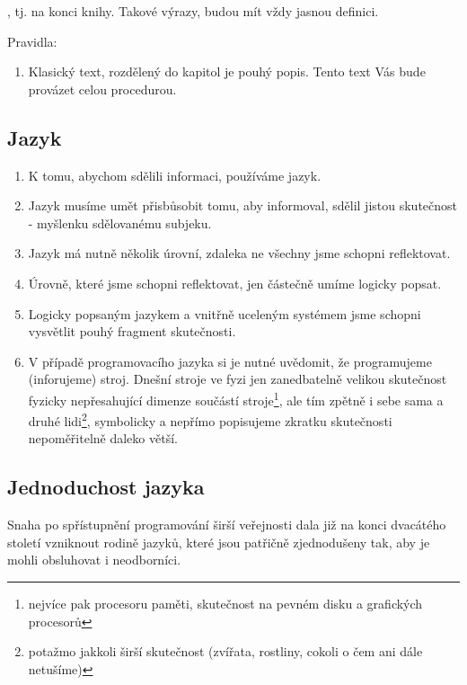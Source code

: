 \documentclass[11pt]{article}
\begin{document}
, tj. na konci knihy. Takové výrazy, budou mít vždy jasnou definici.



Pravidla:

\begin{enumerate}
\item
Klasický text, rozdělený do kapitol je pouhý popis. Tento text Vás bude provázet celou procedurou.


\end{enumerate}


\subsection{Jazyk}


\begin{enumerate}
\item
K tomu, abychom sdělili informaci, používáme jazyk.


\item
Jazyk musíme umět přisbůsobit tomu, aby informoval, sdělil jistou skutečnost - myšlenku sdělovanému subjeku.

\item
Jazyk má nutně několik úrovní, zdaleka ne všechny jsme schopni reflektovat.

\item
Úrovně, které jsme schopni reflektovat, jen částečně umíme logicky popsat.

\item
Logicky popsaným jazykem a vnitřně uceleným systémem jsme schopni vysvětlit pouhý fragment skutečnosti.

\item
V případě programovacího jazyka si je nutné uvědomit, že programujeme (inforujeme) stroj. Dnešní stroje ve fyzi jen zanedbatelně velikou skutečnost fyzicky nepřesahující dimenze součástí stroje\footnote{nejvíce pak procesoru paměti, skutečnost na pevném disku a grafických procesorů}, ale tím zpětně i sebe sama a druhé lidi\footnote{potažmo jakkoli širší skutečnost (zvířata, rostliny, cokoli o čem ani dále netušíme)}, symbolicky a nepřímo popisujeme zkratku skutečnosti nepoměřitelně daleko větší.
\end{enumerate}


\subsection{Jednoduchost jazyka}

Snaha po spřístupnění programování širší veřejnosti dala již na konci dvacátého století vzniknout rodině jazyků, které jsou patřičně zjednodušeny tak, aby je mohli obsluhovat i neodborníci.
\end{document}
